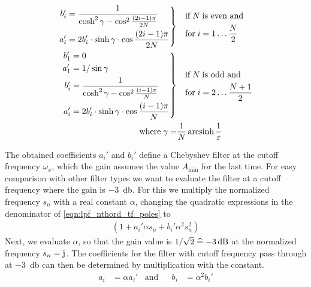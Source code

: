 \begin{align*}
  \left.\begin{aligned}
    b_i' &= \frac{1}{\cosh^2\gamma - \cos^2\frac{(2i-1)\pi}{2N}}\;\\
    a_i' &= 2b_i'\cdot\sinh\gamma\cdot\cos\frac{(2i-1)\pi}{2N}
  \end{aligned}\right\}&
  \quad\begin{aligned}
    &\text{if}\;N\;\text{is even and}\\
    &\text{for}\;i=1\dots\frac{N}{2}
  \end{aligned}\\
  \left.\begin{aligned}
    b_1' &= 0\\
    a_1' &= 1/\sin\gamma\\
    b_i' &= \frac{1}{\cosh^2\gamma - \cos^2\frac{(i-1)\pi}{N}}\;\\
    a_i' &= 2b_i'\cdot\sinh\gamma\cdot\cos\frac{(i-1)\pi}{N}
  \end{aligned}\right\}&
  \quad\begin{aligned}
    &\text{if}\;N\;\text{is odd and}\\
    &\text{for}\;i=2\dots\frac{N+1}{2}
  \end{aligned}\\
  \text{where}\; \gamma = &\frac{1}{N}\operatorname{arcsinh}\frac{1}{\varepsilon}
\end{align*}

The obtained coefficients $a_i'$ and $b_i'$ define a Chebyshev filter at the cutoff frequency $\omega_x$, which the gain assumes the value $A_{\min}$ for the last time. For easy comparison with other filter types we want to evaluate the filter at a cutoff frequency where the gain is \SI{-3}{\decibel}. For this we multiply the normalized frequency $s_n$ with a real constant $\alpha$, changing the quadratic expressions in the denominator of \eqref{eqn:lpf_nthord_tf_poles} to
\begin{align}
  (1 + a_i'\alpha s_n + b_i'\alpha^2s_n^2)
\end{align}
Next, we evaluate $\alpha$, so that the gain value is $1/\sqrt{2}\estimates\SI{-3}{\decibel}$ at the normalized frequency $s_n=\mathrm{j}\mkern1mu$. The coefficients for the filter with cutoff frequency pass through at \SI{-3}{\decibel} can then be determined by multiplication with the constant.
\begin{align}
  &&a_i &= \alpha a_i' &\text{and}& &b_i &= \alpha^2b_i'&& \label{eqn:broken_denominator}
\end{align}

